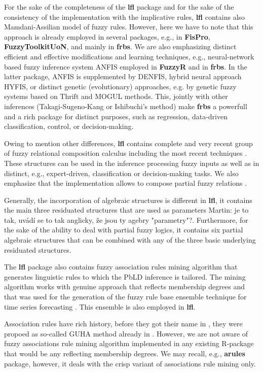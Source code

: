 \documentclass[review]{elsarticle}
\newcommand{\pkg}[1]{\textbf{#1}}
\newcommand{\Martin}[1]{{\color{blue} Martin: #1}}
\begin{document}
For the sake of the completeness of the \pkg{lfl} package and for the sake of the consistency of the implementation with the implicative rules, \pkg{lfl} contains also Mamdani-Assilian model of fuzzy rules. However, here we have to note that this approach is already employed in several packages, e.g., in \pkg{FisPro}, \pkg{FuzzyToolkitUoN}, and mainly in \pkg{frbs}. We are also emphasizing  distinct efficient and effective modifications and learning techniques, e.g., neural-network based fuzzy inference system ANFIS employed in \pkg{FuzzyR} and in \pkg{frbs}. In the latter package, ANFIS is  supplemented by DENFIS, hybrid neural approach HYFIS, or distinct genetic (evolutionary) approaches, e.g. by genetic fuzzy systems based on Thrift and MOGUL methods. This, jointly with other inferences (Takagi-Sugeno-Kang or Ishibuchi's method) make \pkg{frbs} a powerfull and a rich package for distinct purposes, such as regression, data-driven classification, control, or decision-making.

Owing to mention other differences, \pkg{lfl} contains complete and very recent group of fuzzy relational composition calculus including the most recent techniques \citep{CaoStep:ExcludfeatureESWA,Step_etal:Unavoidable_KNOSYS2020}. These structures can be used in the inference processing fuzzy inputs as well as in distinct, e.g., expert-driven, classification or decision-making tasks. We also emphasize that the implementation allows to compose partial fuzzy relations \citep{Step_etal_Dragon_IJAR2019}. 

Generally, the incorporation of algebraic structures is different in \pkg{lfl}, it contains the main three residuated structures that are used as parameters \Martin{je to tak, uvádí se to tak anglicky, že jsou ty agebry "parametry"?}. Furthermore, for the sake of the ability to deal with partial fuzzy logics, it contains six partial algebraic structures that can be combined with any of the three basic underlying residuated structures. 

The \pkg{lfl} package also contains fuzzy association rules mining algorithm that generates linguistic rules to which the PbLD inference is tailored. The mining algorithm works with genuine approach that reflects membership degrees and that was used for the generation of the fuzzy rule base ensemble technique for time series forecasting \citep{StepBurda:FRBE_FSS}. This ensemble is also employed in \pkg{lfl}. 

Association rules have rich history, before they got their name in \citep{Agrawal:assoc_rules}, they were propoed as so-called GUHA method already in \citep{Hajek:GUHA}. However, we are not aware of fuzzy associations rule mining algorithm implemented in any existing R-package that would be any reflecting membership degrees. We may recall, e.g., \pkg{arules} package, however, it deals with the crisp variant of associations rule mining only. 
\end{document}
